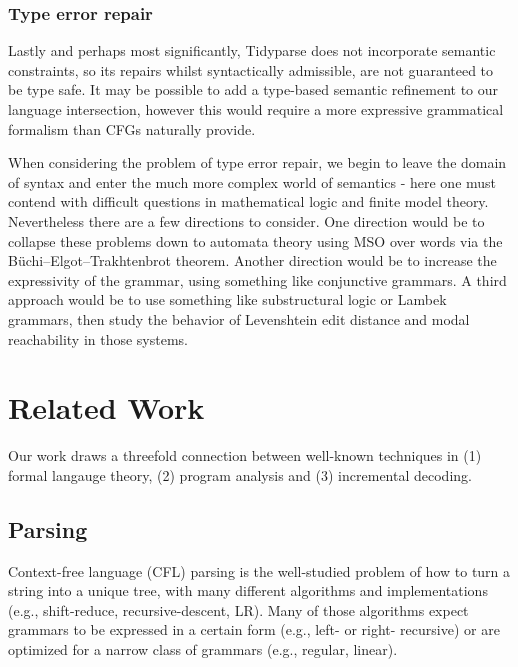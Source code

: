 \documentclass[sigplan,review,acmsmall,nonacm,screen,anonymous]{acmart}\settopmatter{printfolios=false,printccs=false,printacmref=false}
\begin{document}
\subsubsection{Type error repair}

Lastly and perhaps most significantly, Tidyparse does not incorporate semantic constraints, so its repairs whilst syntactically admissible, are not guaranteed to be type safe. It may be possible to add a type-based semantic refinement to our language intersection, however this would require a more expressive grammatical formalism than CFGs naturally provide.

When considering the problem of type error repair, we begin to leave the domain of syntax and enter the much more complex world of semantics - here one must contend with difficult questions in mathematical logic and finite model theory. Nevertheless there are a few directions to consider. One direction would be to collapse these problems down to automata theory using MSO over words via the B\"uchi--Elgot--Trakhtenbrot theorem. Another direction would be to increase the expressivity of the grammar, using something like conjunctive grammars. A third approach would be to use something like substructural logic or Lambek grammars, then study the behavior of Levenshtein edit distance and modal reachability in those systems.

\clearpage\section{Related Work}\label{sec:related}

Our work draws a threefold connection between well-known techniques in (1) formal langauge theory, (2) program analysis and (3) incremental decoding.

\subsection{Parsing}

Context-free language (CFL) parsing is the well-studied problem of how to turn a string into a unique tree, with many different algorithms and implementations (e.g., shift-reduce, recursive-descent, LR). Many of those algorithms expect grammars to be expressed in a certain form (e.g., left- or right- recursive) or are optimized for a narrow class of grammars (e.g., regular, linear).
\end{document}
